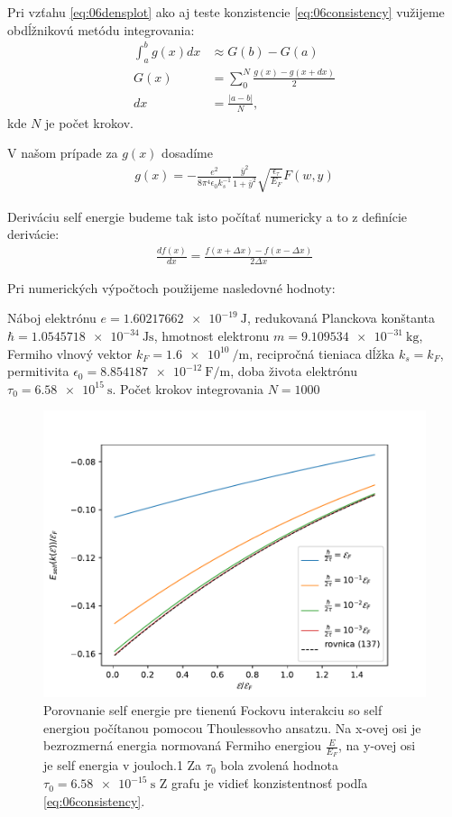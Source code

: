 Pri vzťahu \eqref{eq:06densplot} ako aj teste konzistencie \eqref{eq:06consistency} vužijeme obdĺžnikovú metódu integrovania:
\begin{align}
\int_a^b g(x)dx &\approx G(b)-G(a)\\
G(x) &= \sum_0^N \frac{g(x)-g(x+dx)}{2}\\
dx &= \frac{|a-b|}{N} \text{,}
\end{align}
kde $N$ je počet krokov.

V našom prípade za $g(x)$ dosadíme 
\begin{align}
g(x) = -\frac{e^2}{8\pi^4\epsilon_0 k_s^{-1}} \frac{\bar{y}^2}{1+\bar{y}^2}\sqrt{\frac{\epsilon_\tau}{E_F}}F(w,y)
\end{align}

Deriváciu self energie budeme tak isto počítať numericky a to z definície derivácie:
\begin{align}
\frac{df(x)}{d x} = \frac{f(x+\Delta x)-f(x-\Delta x)}{2\Delta x}
\end{align}

Pri numerických výpočtoch použijeme nasledovné hodnoty:

Náboj elektrónu $e = \SI{1.60217662e-19}{\joule}$, redukovaná Planckova konštanta $\hbar = \SI{1.0545718e-34}{\joule\second}$, hmotnost elektronu
 $m = \SI{9.109534e-31}{\kilo\gram}$, Fermiho vlnový vektor $k_F = \SI{1.6e10}{\per\meter}$, recipročná tieniaca dĺžka $k_s=k_F$, permitivita
 $ \epsilon_0 = \SI{8.854187e-12}{\farad\per\meter}$, doba života elektrónu $\tau_0 = \SI{6.58e15}{\second}$. Počet krokov integrovania $N=1000$
\begin{figure}[H]
\centering
\includegraphics[scale=1]{grafy/plot_se_test}
\caption{Porovnanie self energie pre tienenú Fockovu interakciu so self energiou počítanou pomocou Thoulessovho ansatzu. Na x-ovej osi je bezrozmerná energia normovaná Fermiho energiou $\frac{E}{E_F}$, na y-ovej osi je self energia v jouloch.1 Za $\tau_0$ bola zvolená hodnota $\tau_0=\SI{6.58e-15}{\second}$ Z grafu je vidieť konzistentnosť podľa \eqref{eq:06consistency}.}
\label{fig:plot_test} 
\end{figure}

